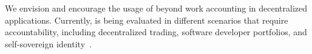 We envision and encourage the usage of \ModelName{} beyond work accounting in decentralized applications.
Currently, \ModelName{} is being evaluated in different scenarios that require accountability, including decentralized trading, software developer portfolios, and self-sovereign identity~\cite{de2020xchange,de2019devid,stokkink2018deployment}.